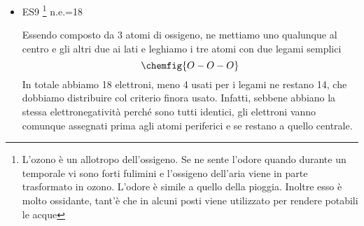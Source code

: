 \begin{itemize}
    Nel diossido di azoto i due ossigeni danno 12 elettroni, l'azoto 5, per un totale di 17 elettroni.
    L'azoto è l'atomo più elettronegativo tra i due, quindi lo mettiamo al centro e ai suoi lati poniamo gli ossigeni, che leghiamo all'azoto con due legami semplici:
    $$
    \chemfig{O-N-O}
    $$
    Abbiamo consumato 4 elettroni, ne restano 13 che distribuiamo attorno agli atomi esterni, perché più elettronegativi. Assegnando una coppia per volta alternando gli ossigeni fino a che questi raggiungano l'ottetto, consumiamo 12 elettroni (3 coppie per atomo). L'elettrone restante viene assegnato all'azoto centrale:
    $$
    \chemfig{@{x1}{\charge{[circle]90=\:,180=\:,270=\:}{O}}-[@{x2}]\charge{[circle]90=\.}{N}-\charge{[circle]0=\:,90=\:,270=\:}{O}}
    \chemmove[shorten <=4pt, shorten >=4pt]{
    \draw(x1.110)..controls +(60:0.5cm)and+(90:0.5cm)..(x2);
    }$$
    In questo modo l'azoto ha 5 elettroni. Avendo attorno a sé un numero dispari di elettroni possiamo già prevedere che non raggiungerà l'ottetto. L'unica cosa che si può fare è prendere un doppietto qualunque di uno dei due ossigeni e trasformalo in doppio legame:
    $$
    \chemfig{\charge{[circle]180=\:,270=\:}{O}=\charge{[circle]90=\.}{N}-\charge{[circle]0=\:,90=\:,270=\:}{O}}
    $$
    In questo modo l'ossigeno di sinistra ha raggiunto l'ottetto (4 dai doppietti più 4 dai legami), quello di destra pure (6 dai doppietti e 2 dal legame), ma l'azoto ha solo 7 elettroni (4 dal doppio legame, 2 dal legame singolo e 1 spaiato). Non possiamo fare altro.

    Tuttavia questo formalismo ci suggerisce che questa molecola, avendo un elettrone spaiato, mostrerà proprietà paramagnetiche.
    \newpage
    \item ES9 \footnote{L'ozono è un allotropo dell'ossigeno. Se ne sente l'odore quando durante un temporale  vi sono forti fulimini e l'ossigeno dell'aria viene in parte trasformato in ozono. L'odore è simile a quello della pioggia. Inoltre esso è molto ossidante, tant'è che in alcuni posti viene utilizzato per rendere potabili le acque} n.e.=18
    
    Essendo composto da 3 atomi di ossigeno, ne mettiamo uno qualunque al centro e gli altri due ai lati e leghiamo i tre atomi con due legami semplici
    $$
    \chemfig{O-O-O}
    $$
    In totale abbiamo 18 elettroni, meno 4 usati per i legami ne restano 14, che dobbiamo distribuire col criterio finora usato. Infatti, sebbene abbiano la stessa elettronegatività perché sono tutti identici, gli elettroni vanno comunque assegnati prima agli atomi periferici e se restano a quello centrale.
    

\end{itemize}
